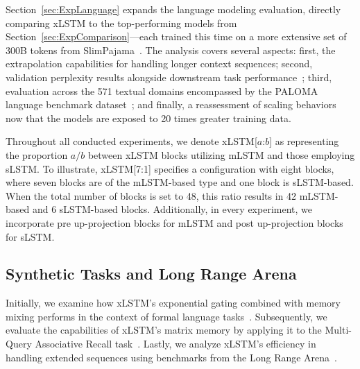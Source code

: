Section~\ref{sec:ExpLanguage} expands the language modeling evaluation, directly comparing xLSTM to the top-performing models from Section~\ref{sec:ExpComparison}—each trained this time on a more extensive set of 300B tokens from SlimPajama~\citep{Soboleva:23}. The analysis covers several aspects: first, the extrapolation capabilities for handling longer context sequences; second, validation perplexity results alongside downstream task performance~\citep{Sutawika:24}; third, evaluation across the 571 textual domains encompassed by the PALOMA language benchmark dataset~\citep{Magnusson:23arxivshort}; and finally, a reassessment of scaling behaviors now that the models are exposed to 20 times greater training data.

\label{sec:xlstm_blocks_notation}
Throughout all conducted experiments, we denote xLSTM[$a$:$b$] as representing the proportion $a/b$ between xLSTM blocks utilizing mLSTM and those employing sLSTM. To illustrate, xLSTM[7:1] specifies a configuration with eight blocks, where seven blocks are of the mLSTM-based type and one block is sLSTM-based. When the total number of blocks is set to 48, this ratio results in 42 mLSTM-based and 6 sLSTM-based blocks. Additionally, in every experiment, we incorporate pre up-projection blocks for mLSTM and post up-projection blocks for sLSTM.

\subsection{Synthetic Tasks and Long Range Arena}
\label{sec:ExpSyntethic}
Initially, we examine how xLSTM's exponential gating combined with memory mixing performs in the context of formal language tasks~\citep{Deletang:23}. Subsequently, we evaluate the capabilities of xLSTM's matrix memory by applying it to the Multi-Query Associative Recall task~\citep{Arora:23arxiv}. Lastly, we analyze xLSTM's efficiency in handling extended sequences using benchmarks from the Long Range Arena~\citep{Tay:21}.

